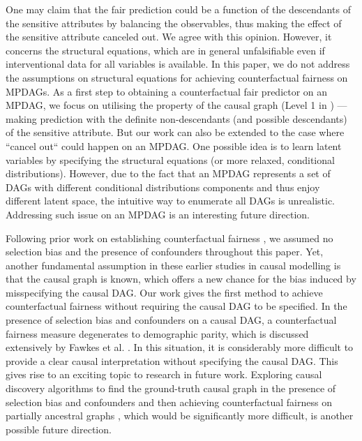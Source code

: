 \documentclass{article}
\begin{document}
One may claim that the fair prediction could be a function of the descendants of the sensitive attributes by balancing the observables, thus making the effect of the sensitive attribute canceled out. We agree with this opinion.  However, it concerns the structural equations, which are in general unfalsifiable even if interventional data for all variables is available.
In this paper, we do not address the assumptions on structural equations for achieving counterfactual fairness on MPDAGs. As a first step to obtaining a counterfactual fair predictor on an MPDAG, we focus on utilising the property of the causal graph (Level 1 in \citep{kusner2017counterfactual}) — making prediction with the definite non-descendants (and possible descendants) of the sensitive attribute. But our work can also be extended to the case where “cancel out“ could happen on an MPDAG. One possible idea is to learn latent variables by specifying the structural equations (or more relaxed, conditional distributions). However, due to the fact that an MPDAG represents a set of DAGs with different conditional distributions components and thus enjoy different latent space, the intuitive way to enumerate all DAGs is unrealistic. Addressing such issue on an MPDAG is an interesting future direction.

Following prior work on establishing counterfactual fairness \citep{zhang2017causal, chiappa2019path, chikahara2021learning, wu2019counterfactual}, we assumed no selection bias and the presence of confounders throughout this paper. 
Yet, another fundamental assumption in these earlier studies in causal modelling is that the causal graph is known, which offers a new chance for the bias induced by misspecifying the causal DAG. Our work gives the first method to achieve counterfactual fairness without requiring the causal DAG to be specified.
In the presence of selection bias and confounders on a causal DAG, a counterfactual fairness measure degenerates to demographic parity, which is discussed extensively by Fawkes et al. \citep{fawkes2021selection}. In this situation, it is considerably more difficult to provide a clear causal interpretation without specifying the causal DAG.
This gives rise to an exciting topic to research in future work. Exploring causal discovery algorithms to find the ground-truth causal graph in the presence of selection bias and confounders and then achieving counterfactual fairness on partially ancestral graphs \citep{richardson2002ancestral,zhang2008causal}, which would be significantly more difficult, is another possible future direction.
\end{document}
